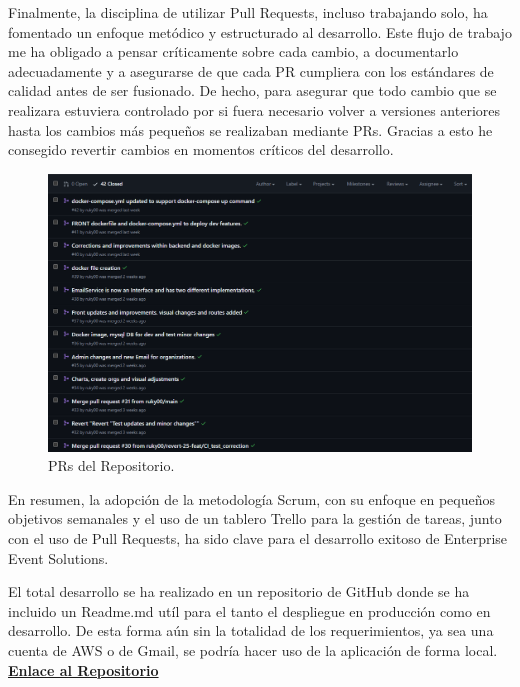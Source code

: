 Finalmente, la disciplina de utilizar Pull Requests, incluso trabajando solo, ha fomentado un enfoque metódico y estructurado al desarrollo. Este 
flujo de trabajo me ha obligado a pensar críticamente sobre cada cambio, a documentarlo adecuadamente y a asegurarse de que cada PR cumpliera con los 
estándares de calidad antes de ser fusionado. De hecho, para asegurar que todo cambio que se realizara estuviera controlado por si fuera necesario volver a versiones anteriores
hasta los cambios más pequeños se realizaban mediante PRs. Gracias a esto he consegido revertir cambios en momentos críticos del desarrollo.
\newpage
\begin{figure}[h]
    \centering
    \includegraphics[width=\linewidth]{PRs.png}
    \caption{PRs del Repositorio.}
    \label{fig:metodologias2}
\end{figure}

En resumen, la adopción de la metodología Scrum, con su enfoque en pequeños objetivos semanales y el uso de un tablero Trello para la gestión de tareas, 
junto con el uso de Pull Requests, ha sido clave para el desarrollo exitoso de Enterprise Event Solutions.

El total desarrollo se ha realizado en un repositorio de GitHub donde se ha incluido un Readme.md utíl para el tanto el despliegue en producción como en desarrollo. De esta forma
aún sin la totalidad de los requerimientos, ya sea una cuenta de AWS o de Gmail, se podría hacer uso de la aplicación de forma local.  \textbf{\href{https://github.com/ruky00/EnterpriseEventSolutions}{Enlace al Repositorio}}
